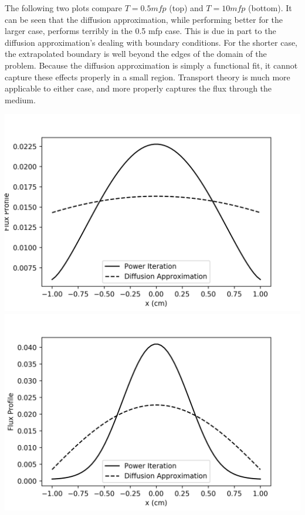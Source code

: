 \documentclass{amsart}
\theoremstyle{definition}
\begin{document}
The following two plots compare $T=0.5mfp$ (top) and $T=10mfp$ (bottom).
It can be seen that the diffusion approximation, while performing better for the larger case, performs terribly in the 0.5 mfp case.
This is due in part to the diffusion approximation's dealing with boundary conditions.
For the shorter case, the extrapolated boundary is well beyond the edges of the domain of the problem.
Because the diffusion approximation is simply a functional fit, it cannot capture these effects properly in a small region.
Transport theory is much more applicable to either case, and more properly captures the flux through the medium.

\begin{center}
\includegraphics[totalheight=.40\textheight]{p4_05.png}
\includegraphics[totalheight=.40\textheight]{p4_10.png}
\end{center}


 
\end{document}
